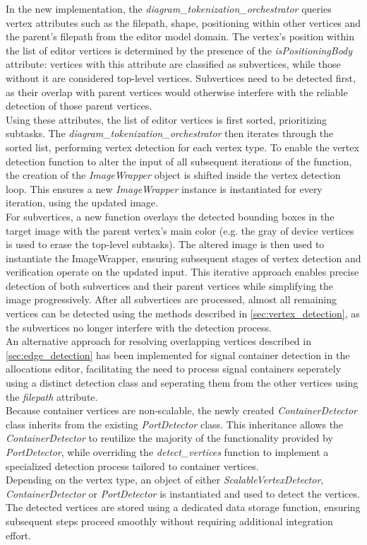 In the new implementation, the \textit{diagram\_tokenization\_orchestrator} queries vertex attributes such as the filepath, shape, positioning within other vertices and the parent's filepath from the editor model domain. The vertex's position within the list of editor vertices is determined by the presence of the \textit{isPositioningBody} attribute: vertices with this attribute are classified as subvertices, while those without it are considered top-level vertices. Subvertices need to be detected first, as their overlap with parent vertices would otherwise interfere with the reliable detection of those parent vertices.\\
Using these attributes, the list of editor vertices is first sorted, prioritizing subtasks. The \textit{diagram\_tokenization\_orchestrator} then iterates through the sorted list, performing vertex detection for each vertex type. 
To enable the vertex detection function to alter the input of all subsequent iterations of the function, the creation of the \textit{ImageWrapper} object is shifted inside the vertex detection loop. This ensures a new \textit{ImageWrapper} instance is instantiated for every iteration, using the updated image.\\
For subvertices, a new function overlays the detected bounding boxes in the target image with the parent vertex's main color (e.g. the gray of device vertices is used to erase the top-level subtasks). The altered image is then used to instantiate the ImageWrapper, ensuring subsequent stages of vertex detection and verification operate on the updated input. This iterative approach enables precise detection of both subvertices and their parent vertices while simplifying the image progressively.
After all subvertices are processed, almost all remaining vertices can be detected using the methods described in \autoref{sec:vertex_detection}, as the subvertices no longer interfere with the detection process.\\
An alternative approach for resolving overlapping vertices described in \autoref{sec:edge_detection} has been implemented for signal container detection in the allocations editor, facilitating the need to process signal containers seperately using a distinct detection class and seperating them from the other vertices using the \textit{filepath} attribute.\\
Because container vertices are non-scalable, the newly created \textit{ContainerDetector} class inherits from the existing \textit{PortDetector} class. This inheritance allows the \textit{ContainerDetector} to reutilize the majority of the functionality provided by \textit{PortDetector}, while overriding the \textit{detect\_vertices} function to implement a specialized detection process tailored to container vertices.\\
Depending on the vertex type, an object of either \textit{ScalableVertexDetector}, \textit{ContainerDetector} or \textit{PortDetector} is instantiated and used to detect the vertices.\\
The detected vertices are stored using a dedicated data storage function, ensuring subsequent steps proceed smoothly without requiring additional integration effort.

